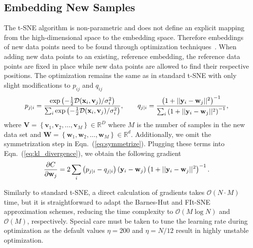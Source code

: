\documentclass[article]{jss}
\begin{document}
\subsection{Embedding New Samples} \label{sec:meth.transform}

The t-SNE algorithm is non-parametric and does not define an explicit mapping from the
high-dimensional space to the embedding space. Therefore embeddings of new data
points need to be found through optimization
techniques~\citep{policar2021embedding}. When adding new data points to an
existing, reference embedding, the reference data points are fixed in place
while new data points are allowed to find their respective positions. The
optimization remains the same as in standard t-SNE with only slight
modifications to $p_{ij}$ and $q_{ij}$
\begin{align}
p_{j \mid i} = \frac{\exp \left ( -\frac{1}{2} \mathcal{D}(\mathbf{x}_i, \mathbf{v}_j) /  \sigma_i^2 \right )}{\sum_{i} \exp \left ( -\frac{1}{2} \mathcal{D}(\mathbf{x}_i, \mathbf{v}_j) / \sigma_i^2 \right )}, \qquad
q_{j \mid i} = \frac{\left ( 1 + || \mathbf{y}_i - \mathbf{w}_j ||^2 \right )^{-1}}{\sum_{i}\left ( 1 + || \mathbf{y}_i - \mathbf{w}_j ||^2 \right )^{-1}}, \notag
\end{align}
\noindent where $\mathbf{V} = \left \{ \mathbf{v}_1, \mathbf{v}_2, \dots,
\mathbf{v}_M \right \} \in \mathbb{R}^D$ where $M$ is the number of samples in
the new data set and $\mathbf{W} = \left \{ \mathbf{w}_1, \mathbf{w}_2, \dots,
\mathbf{w}_M \right \} \in \mathbb{R}^d$. Additionally, we omit the
symmetrization step in Eqn.~(\ref{eq:symmetrize}). Plugging these terms into
Eqn.~(\ref{eq:kl_divergence}), we obtain the following gradient
\begin{equation}
\frac{\partial C}{\partial \mathbf{w}_j} = 2 \sum_i \left ( p_{j \mid i} - q_{j \mid i} \right ) \left ( \mathbf{y}_i - \mathbf{w}_j \right ) \left ( 1 + || \mathbf{y}_i - \mathbf{w}_j || ^2 \right )^{-1}. \notag
\label{eq:gradient}
\end{equation}

Similarly to standard t-SNE, a direct calculation of gradients takes
$\mathcal{O}(N \cdot M)$ time, but it is straightforward to adapt the Barnes-Hut
and FIt-SNE approximation schemes, reducing the time complexity to
$\mathcal{O}(M \log N)$ and $\mathcal{O}(M)$, respectively. Special care must be
taken to tune the learning rate during optimization as the default values
$\eta=200$ and $\eta=N/12$ result in highly unstable optimization.
\end{document}
